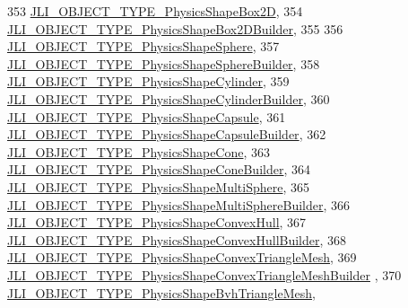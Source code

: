 \begin{DoxyCode}
353     \mbox{\hyperlink{namespacenjli_a6d56d4fbaf89fcf3e3d32839df05b444ae68612d60428ec8a104053d57754d9fa}{JLI\_OBJECT\_TYPE\_PhysicsShapeBox2D}},
354     \mbox{\hyperlink{namespacenjli_a6d56d4fbaf89fcf3e3d32839df05b444a6a592fcc3b7ce43cdcd37ce1d72640fb}{JLI\_OBJECT\_TYPE\_PhysicsShapeBox2DBuilder}},
355 
356     \mbox{\hyperlink{namespacenjli_a6d56d4fbaf89fcf3e3d32839df05b444a9b5fdd65d1ec1734fce1c64fa0c2dc9c}{JLI\_OBJECT\_TYPE\_PhysicsShapeSphere}},
357     \mbox{\hyperlink{namespacenjli_a6d56d4fbaf89fcf3e3d32839df05b444a9d41ced00c77b02bb257530b59a1b2fe}{JLI\_OBJECT\_TYPE\_PhysicsShapeSphereBuilder}},
358     \mbox{\hyperlink{namespacenjli_a6d56d4fbaf89fcf3e3d32839df05b444a178007e15296eccc25b9602c1f2a9f47}{JLI\_OBJECT\_TYPE\_PhysicsShapeCylinder}},
359     \mbox{\hyperlink{namespacenjli_a6d56d4fbaf89fcf3e3d32839df05b444add2c79d085ed5776077871b8bc280204}{JLI\_OBJECT\_TYPE\_PhysicsShapeCylinderBuilder}},
360     \mbox{\hyperlink{namespacenjli_a6d56d4fbaf89fcf3e3d32839df05b444aff48184530376f3723f7f09301608f3e}{JLI\_OBJECT\_TYPE\_PhysicsShapeCapsule}},
361     \mbox{\hyperlink{namespacenjli_a6d56d4fbaf89fcf3e3d32839df05b444a6da38428a49ecdcdff1c71fe7d2ccebb}{JLI\_OBJECT\_TYPE\_PhysicsShapeCapsuleBuilder}},
362     \mbox{\hyperlink{namespacenjli_a6d56d4fbaf89fcf3e3d32839df05b444a91c37fbbf9083c53a2a8354b9e70ebfe}{JLI\_OBJECT\_TYPE\_PhysicsShapeCone}},
363     \mbox{\hyperlink{namespacenjli_a6d56d4fbaf89fcf3e3d32839df05b444a20e3698a8a88dd00bd8a1fb3efd62f05}{JLI\_OBJECT\_TYPE\_PhysicsShapeConeBuilder}},
364     \mbox{\hyperlink{namespacenjli_a6d56d4fbaf89fcf3e3d32839df05b444abd3f8753d211741594da6e64d38b433f}{JLI\_OBJECT\_TYPE\_PhysicsShapeMultiSphere}},
365     \mbox{\hyperlink{namespacenjli_a6d56d4fbaf89fcf3e3d32839df05b444a2eb0f869b0f71a386302f903fb965fcd}{JLI\_OBJECT\_TYPE\_PhysicsShapeMultiSphereBuilder}},
366     \mbox{\hyperlink{namespacenjli_a6d56d4fbaf89fcf3e3d32839df05b444ab77b0553c701df22963e8e69f169f742}{JLI\_OBJECT\_TYPE\_PhysicsShapeConvexHull}},
367     \mbox{\hyperlink{namespacenjli_a6d56d4fbaf89fcf3e3d32839df05b444aabf3a6ad363f0b347a569f0c709b0556}{JLI\_OBJECT\_TYPE\_PhysicsShapeConvexHullBuilder}},
368     \mbox{\hyperlink{namespacenjli_a6d56d4fbaf89fcf3e3d32839df05b444a618d3de353555744920b05b8eb806125}{JLI\_OBJECT\_TYPE\_PhysicsShapeConvexTriangleMesh}},
369     \mbox{\hyperlink{namespacenjli_a6d56d4fbaf89fcf3e3d32839df05b444ab9cc9c112f7a53d0d31fc366fd340ed1}{JLI\_OBJECT\_TYPE\_PhysicsShapeConvexTriangleMeshBuilder}}
      ,
370     \mbox{\hyperlink{namespacenjli_a6d56d4fbaf89fcf3e3d32839df05b444a46fbd4ecdb7613c10a9d279a57f79638}{JLI\_OBJECT\_TYPE\_PhysicsShapeBvhTriangleMesh}},

\end{DoxyCode}
